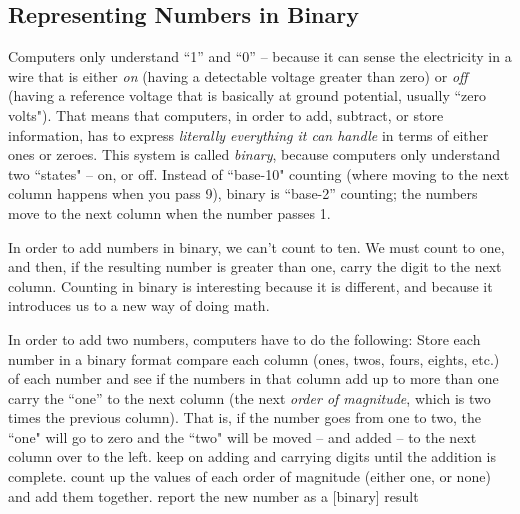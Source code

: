 \newpage
\subsection*{Representing Numbers in Binary}

Computers only understand ``1'' and ``0'' -- because it can sense the electricity in a wire that is either \emph{on} (having a detectable voltage greater than zero) or \emph{off} (having a reference voltage that is basically at ground potential, usually ``zero volts"). That means that computers, in order to add, subtract, or store information, has to express \emph{literally everything it can handle} in terms of either ones or zeroes. This system is called \emph{binary}, because computers only understand two ``states" -- on, or off. Instead of ``base-10" counting (where moving to the next column happens when you pass 9), binary is ``base-2'' counting; the numbers move to the next column when the number passes 1.

In order to add numbers in binary, we can't count to ten. We must count to one, and then, if the resulting number is greater than one, carry the digit to the next column. Counting in binary is interesting because it is different, and because it introduces us to a new way of doing math.

In order to add two numbers, computers have to do the following:
\be
\+ Store each number in a binary format
\+ compare each column (ones, twos, fours, eights, etc.) of each number and see if the numbers in that column add up to more than one
\+ carry the ``one'' to the next column (the next \emph{order of magnitude}, which is two times the previous column). That is, if the number goes from one to two, the ``one" will go to zero and the ``two" will be moved -- and added -- to the next column over to the left.
\+ keep on adding and carrying digits until the addition is complete.
\+ count up the values of each order of magnitude (either one, or none) and add them together.
\+ report the new number as a [binary] result
\ee

